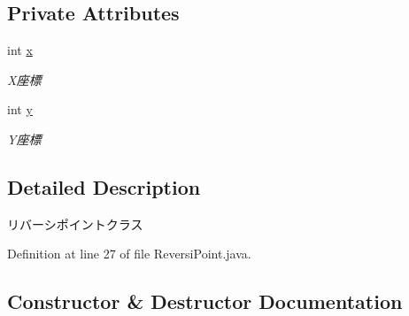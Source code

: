\subsection*{Private Attributes}
\begin{DoxyCompactItemize}
\item 
\mbox{\label{classjp_1_1gr_1_1java__conf_1_1yuta__yoshinaga_1_1reversi_1_1model_1_1_reversi_point_af41c34bc1ea9531eb815cfc74bccd0c1}} 
int \hyperlink{classjp_1_1gr_1_1java__conf_1_1yuta__yoshinaga_1_1reversi_1_1model_1_1_reversi_point_af41c34bc1ea9531eb815cfc74bccd0c1}{x}
\begin{DoxyCompactList}\small\item\em X座標 \end{DoxyCompactList}\item 
\mbox{\label{classjp_1_1gr_1_1java__conf_1_1yuta__yoshinaga_1_1reversi_1_1model_1_1_reversi_point_a39c67072f0ee5bcf0b8c6c03b1c10ed8}} 
int \hyperlink{classjp_1_1gr_1_1java__conf_1_1yuta__yoshinaga_1_1reversi_1_1model_1_1_reversi_point_a39c67072f0ee5bcf0b8c6c03b1c10ed8}{y}
\begin{DoxyCompactList}\small\item\em Y座標 \end{DoxyCompactList}\end{DoxyCompactItemize}


\subsection{Detailed Description}
リバーシポイントクラス 

Definition at line 27 of file Reversi\+Point.\+java.



\subsection{Constructor \& Destructor Documentation}
\mbox{\label{classjp_1_1gr_1_1java__conf_1_1yuta__yoshinaga_1_1reversi_1_1model_1_1_reversi_point_a0d214a37c3858ca54e26cc6d5adb2c0b}} 
